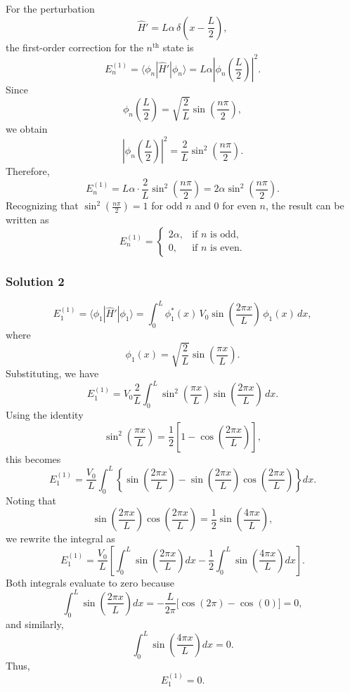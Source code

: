 \documentclass{article}
\begin{document}
For the perturbation
\[
\hat{H}' = L \alpha \, \delta\!\left(x - \frac{L}{2}\right),
\]
the first-order correction for the \(n^{\text{th}}\) state is
\[
E_n^{(1)} = \langle \phi_n | \hat{H}' | \phi_n \rangle = L\alpha \left|\phi_n\!\left(\frac{L}{2}\right)\right|^2.
\]
Since
\[
\phi_n\!\left(\frac{L}{2}\right) = \sqrt{\frac{2}{L}} \sin\!\left(\frac{n\pi}{2}\right),
\]
we obtain
\[
\left|\phi_n\!\left(\frac{L}{2}\right)\right|^2 = \frac{2}{L} \sin^2\!\left(\frac{n\pi}{2}\right).
\]
Therefore,
\[
E_n^{(1)} = L\alpha \cdot \frac{2}{L} \sin^2\!\left(\frac{n\pi}{2}\right) = 2\alpha \sin^2\!\left(\frac{n\pi}{2}\right).
\]
Recognizing that \(\sin^2\!\left(\frac{n\pi}{2}\right) = 1\) for odd \(n\) and \(0\) for even \(n\), the result can be written as
\[
E_n^{(1)} =
\begin{cases}
2\alpha, & \text{if } n \text{ is odd}, \\
0, & \text{if } n \text{ is even}.
\end{cases}
\]

\subsubsection{Solution 2}
\[
E_1^{(1)} = \langle \phi_1 | \hat{H}' | \phi_1 \rangle 
= \int_0^L \phi_1^*(x)\, V_0 \sin\left(\frac{2\pi x}{L}\right)\, \phi_1(x)\, dx,
\]
where 
\[
\phi_1(x)=\sqrt{\frac{2}{L}} \sin\left(\frac{\pi x}{L}\right).
\]
Substituting, we have
\[
E_1^{(1)} = V_0 \frac{2}{L}\int_0^L \sin^2\left(\frac{\pi x}{L}\right) \sin\left(\frac{2\pi x}{L}\right)\, dx.
\]
Using the identity
\[
\sin^2\left(\frac{\pi x}{L}\right)=\frac{1}{2}\left[1-\cos\left(\frac{2\pi x}{L}\right)\right],
\]
this becomes
\[
E_1^{(1)} = \frac{V_0}{L}\int_0^L \left\{ \sin\left(\frac{2\pi x}{L}\right)-\sin\left(\frac{2\pi x}{L}\right)\cos\left(\frac{2\pi x}{L}\right) \right\}dx.
\]
Noting that
\[
\sin\left(\frac{2\pi x}{L}\right)\cos\left(\frac{2\pi x}{L}\right) = \frac{1}{2}\sin\left(\frac{4\pi x}{L}\right),
\]
we rewrite the integral as
\[
E_1^{(1)} = \frac{V_0}{L}\left[\int_0^L \sin\left(\frac{2\pi x}{L}\right)dx - \frac{1}{2}\int_0^L \sin\left(\frac{4\pi x}{L}\right)dx\right].
\]
Both integrals evaluate to zero because
\[
\int_0^L \sin\left(\frac{2\pi x}{L}\right)dx = -\frac{L}{2\pi}\Big[\cos(2\pi)-\cos(0)\Big] = 0,
\]
and similarly,
\[
\int_0^L \sin\left(\frac{4\pi x}{L}\right)dx = 0.
\]
Thus,
\[
E_1^{(1)} = 0.
\]
\end{document}

